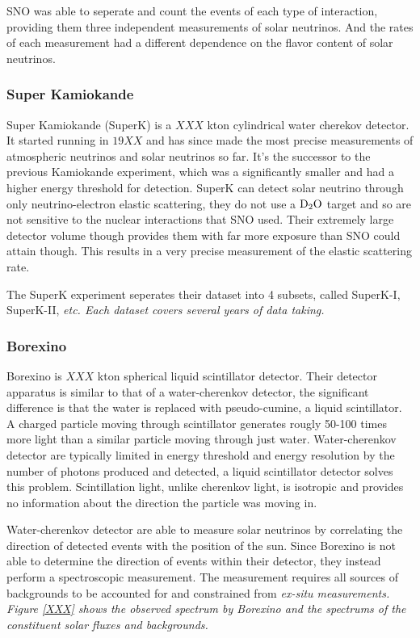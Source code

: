 SNO was able to seperate and count the events of each type of interaction,
providing them three independent measurements of solar neutrinos. And
the rates of each measurement had a different dependence on the flavor content
of solar neutrinos.


\subsubsection{Super Kamiokande}
Super Kamiokande (SuperK) is a $XXX$ kton cylindrical water cherekov detector.
It started running in $19XX$ and has since made the most precise measurements of
atmospheric neutrinos and solar neutrinos so far.
It's the successor to the previous Kamiokande experiment, which was a significantly
smaller and had a higher energy threshold for detection.
SuperK can detect solar neutrino through only neutrino-electron elastic scattering,
they do not use a $\ce{D_{2}O}$ target and so are not sensitive to the
nuclear interactions that SNO used.
Their extremely large detector volume though provides them with far more exposure
than SNO could attain though. This results in a very precise measurement of the
elastic scattering rate.

The SuperK experiment seperates their dataset into 4 subsets, called
SuperK-I, SuperK-II, \it{etc}. %
Each dataset covers several years of data taking.

\subsubsection{Borexino}
Borexino is $XXX$ kton spherical liquid scintillator detector. Their detector
apparatus is similar to that of a water-cherenkov detector, the significant difference
is that the water is replaced with pseudo-cumine, a liquid scintillator.
A charged particle moving through scintillator generates rougly 50-100 times
more light than a similar particle moving through just water.
Water-cherenkov detector are typically limited in energy threshold
and energy resolution by the number of photons produced and detected, a liquid scintillator
detector solves this problem.  Scintillation light, unlike cherenkov light,
is isotropic and provides no information about the direction the particle
was moving in.

Water-cherenkov detector are able to measure solar neutrinos by correlating the
direction of detected events with the position of the sun. Since Borexino is not
able to determine the direction of events within their detector, they instead
perform a spectroscopic measurement. The measurement requires
all sources of backgrounds to be accounted for and constrained from \it{ex-situ}
measurements. Figure \ref{XXX} shows the observed spectrum by Borexino and the
spectrums of the constituent solar fluxes and backgrounds.

